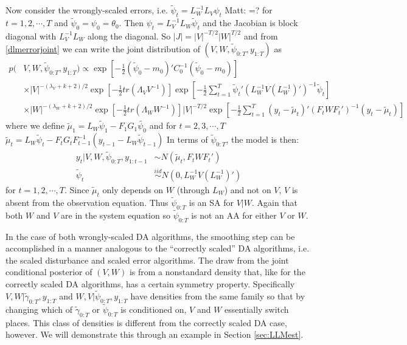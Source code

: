 \documentclass{article}
\newcommand{\matt}[1]{{\color{red} Matt: #1}}
\begin{document}
Now consider the wrongly-scaled errors, i.e. $\tilde{\psi}_t=L_W^{-1}L_V\psi_t$\matt{=?} for $t=1,2,\cdots,T$ and $\tilde{\psi}_0=\psi_0=\theta_0$. Then $\psi_t = L_V^{-1}L_W\tilde{\psi}_t$ and the Jacobian is block diagonal with $L_V^{-1}L_W$ along the diagonal. So $|J|=|V|^{-T/2}|W|^{T/2}$ and from \eqref{dlmerrorjoint} we can write the joint distribution of $(V, W, \tilde{\psi}_{0:T}, y_{1:T})$ as
\begin{align}
    p(&V,W,\tilde{\psi}_{0:T},y_{1:T}) \propto \exp\left[-\frac{1}{2}(\tilde{\psi}_0-m_0)'C_0^{-1}(\tilde{\psi}_0-m_0)\right] \nonumber\\
   &\times |V|^{-(\lambda_V + k + 2)/2}\exp\left[-\frac{1}{2}tr\left(\Lambda_VV^{-1}\right)\right] \exp\left[-\frac{1}{2}\sum_{t=1}^T\tilde{\psi}_t'(L_W^{-1}V(L_W^{-1})')^{-1}\tilde{\psi}_t\right] \nonumber\\
    & \times |W|^{-(\lambda_W + k + 2)/2}\exp\left[-\frac{1}{2}tr\left(\Lambda_WW^{-1}\right)\right] |V|^{-T/2}\exp\left[-\frac{1}{2}\sum_{t=1}^T(y_t - \tilde{\mu}_t)'(F_tWF_t')^{-1}(y_t-\tilde{\mu}_t)\right]\label{dlmerrortildejoint}
 \end{align}
where we define $\tilde{\mu}_1 = L_W\tilde{\psi}_1 - F_1G_1\tilde{\psi_0}$ and for $t=2,3,\cdots,T$ $\tilde{\mu}_t =L_W\tilde{\psi}_t - F_tG_tF_{t-1}^{-1}(y_{t-1} - L_{W}\tilde{\psi}_{t-1})$ In terms of $\tilde{\psi}_{0:T}$, the model is then:
 \begin{align*}
   y_t|V,W,\tilde{\psi}_{0:T},y_{1:t-1} &\sim N(\tilde{\mu}_t, F_tWF_t')\\
   \tilde{\psi}_t & \stackrel{iid}{\sim} N(0,L_W^{-1}V(L_W^{-1})')
\end{align*}
for $t=1,2,\cdots,T$. Since $\tilde{\mu}_t$ only depends on $W$ (through $L_W$) and not on $V$, $V$ is absent from the observation equation. Thus $\tilde{\psi}_{0:T}$ is an SA for $V|W$. Again that both $W$ and $V$ are in the system equation so $\tilde{\psi}_{0:T}$ is not an AA for either $V$ or $W$.

In the case of both wrongly-scaled DA algorithms, the smoothing step can be accomplished in a manner analogous to the ``correctly scaled'' DA algorithms, i.e. the scaled disturbance and scaled error algorithms. The draw from the joint conditional posterior of $(V,W)$ is from a nonstandard density that, like for the correctly scaled DA algorithms, has a certain symmetry property. Specifically $V,W|\tilde{\gamma}_{0:T},y_{1:T}$ and $W,V|\tilde{\psi}_{0:T},y_{1:T}$ have densities from the same family so that by changing which of $\tilde{\gamma}_{0:T}$ or $\tilde{\psi}_{0:T}$ is conditioned on, $V$ and $W$ essentially switch places. This class of densities is different from the correctly scaled DA case, however. We will demonstrate this through an example in Section \ref{sec:LLMest}.
\end{document}
